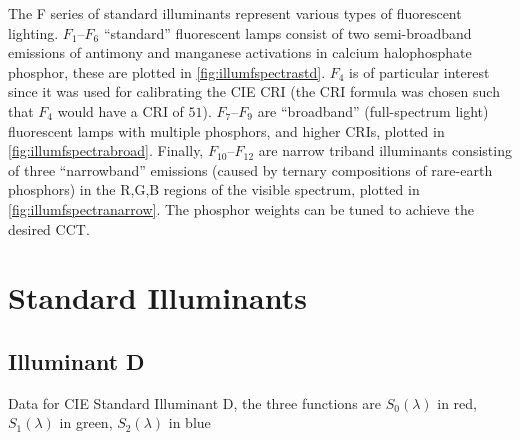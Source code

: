 The F series of standard illuminants represent various types of fluorescent lighting.
$F_1$--$F_6$ ``standard'' fluorescent lamps consist of two semi-broadband
emissions of
antimony and manganese activations in calcium halophosphate phosphor, these are
plotted in \cref{fig:illumfspectrastd}. $F_4$ is of
particular interest since it was used for calibrating the \gls{CIE} \gls{CRI}
(the \gls{CRI} formula was chosen such that $F_4$ would have a \gls{CRI} of
$51$).
$F_7$--$F_9$ are ``broadband'' (full-spectrum light) fluorescent lamps with
multiple phosphors, and higher \glspl{CRI}, plotted in
\cref{fig:illumfspectrabroad}. Finally, $F_{10}$--$F_{12}$ are narrow
triband illuminants consisting of three ``narrowband'' emissions (caused by
ternary
compositions of rare-earth phosphors) in the R,G,B regions of the visible
spectrum, plotted in \cref{fig:illumfspectranarrow}.
The phosphor weights can be tuned to achieve the desired \gls{CCT}.


\section{Standard Illuminants}\label{ch:stdilldata}

\subsection{Illuminant D}

Data for CIE Standard Illuminant D, the three functions
are $S_0(\lambda)$ in red, $S_1(\lambda)$ in green, $S_2(\lambda)$ in blue


